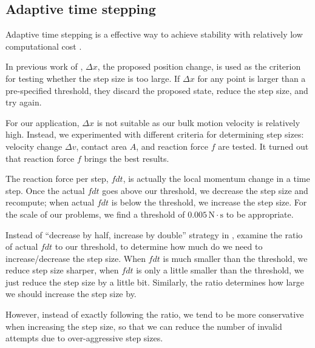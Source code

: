 \documentclass[letterpaper,9pt,twocolumn]{extarticle}
\begin{document}
	\subsection{Adaptive time stepping}
		Adaptive time stepping is a effective way to achieve stability with relatively low computational cost \cite{Soderlind06}.
		
		In previous work of \cite{Baraff98}, $\Delta x$, the proposed position change, is used as the criterion for testing whether the step size is too large. If $\Delta x$ for any point is larger than a pre-specified threshold, they discard the
		proposed state, reduce the step size, and try again.
		
		For our application, $\Delta x$ is not suitable as our bulk motion velocity is relatively high. Instead,  we experimented with different criteria for determining step sizes: velocity change $\Delta v$, contact area $A$, and reaction force $f$ are tested. It turned out that reaction force $f$ brings the best results.
		
		The reaction force per step, $fdt$, is actually the local momentum change in a time step. Once the actual $fdt$ goes above our threshold, we decrease the step size and recompute; when actual $fdt$ is below the threshold, we increase the step size. For the scale of our problems, we find a threshold of $0.005\,\mathrm{N\cdot s}$ to be appropriate.
		
		Instead of ``decrease by half, increase by double'' strategy in \cite{Baraff98},  examine the ratio of actual $fdt$ to our threshold, to determine how much do we need to increase/decrease the step size. When $fdt$ is much smaller than the threshold, we reduce step size sharper, when $fdt$ is only a little smaller than the threshold, we just reduce the step size by a little bit. Similarly, the ratio determines how large we should increase the step size by.
		
		However, instead of exactly following the ratio, we tend to be more conservative when increasing the step size, so that we can reduce the number of invalid attempts due to over-aggressive step sizes.
	
\end{document}
